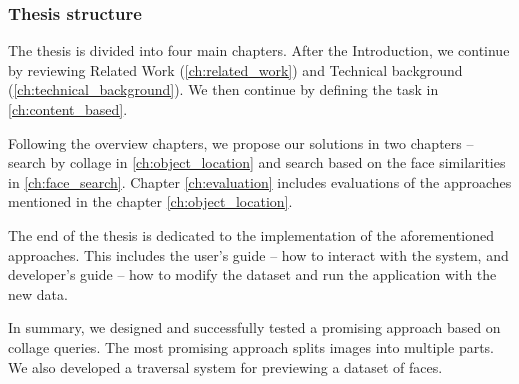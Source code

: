 \subsubsection*{Thesis structure}

The thesis is divided into four main chapters. After the Introduction, we continue by reviewing Related Work (\autoref{ch:related_work}) and Technical background (\autoref{ch:technical_background}). We then continue by defining the task in \autoref{ch:content_based}.

Following the overview chapters, we propose our solutions in two chapters -- search by collage in \autoref{ch:object_location} and search based on the face similarities in \autoref{ch:face_search}. Chapter \ref{ch:evaluation} includes evaluations of the approaches mentioned in the chapter \ref{ch:object_location}.

The end of the thesis is dedicated to the implementation of the aforementioned approaches. This includes the user's guide -- how to interact with the system, and developer's guide -- how to modify the dataset and run the application with the new data.

\bigskip

In summary, we designed and successfully tested a promising approach based on collage queries. The most promising approach splits images into multiple parts. We also developed a traversal system for previewing a dataset of faces.